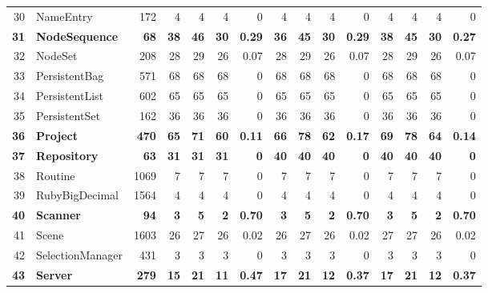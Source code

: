 \documentclass{acm_proc_article-sp}
\begin{document}
\begin{table} [htp!]
{\begin{tabularx}{1 \textwidth}{r l r r r r r r r r r r r r r}
30						& NameEntry				&172		& 4		&	4	&	4	& 	0					& 4		& 4 		& 4		& 		0			& 4			& 4			& 4			&	0	\\  
\textbf{31}						& \textbf{NodeSequence}			&\textbf{68}			& \textbf{38}		&	\textbf{46}	&	\textbf{30}	& 	\textbf{0.29}					& \textbf{36}		& \textbf{45} 		& \textbf{30}		& 		\textbf{0.29}			& \textbf{38}			& \textbf{45}			& \textbf{30}			&	\textbf{0.27}	\\     
32						& NodeSet				&208		& 28		&	29	&	26	& 	0.07					& 28		& 29 		& 26		& 		0.07			& 28			& 29			& 26			&	0.07	\\  
33						& PersistentBag			&571		& 68		&	68	&	68	& 	0					& 68		&  68		& 68		& 		0			& 68			& 68			& 68			&	0	\\         
34						& PersistentList				&602		& 65		&	65	&	65	& 	0					& 65		&  65		& 65		& 		0			& 65			& 65			& 65			&	0	\\    
35						& PersistentSet				&162		& 36		&	36	&	36	& 	0					& 36		&  36		& 36		& 		0			& 36			& 36			& 36 			&	0	\\        
\textbf{36}						& \textbf{Project}					&\textbf{470}		& \textbf{65}		&	\textbf{71}	&	\textbf{60}	& 	\textbf{0.11}					& \textbf{66}		&  \textbf{78}		& \textbf{62}		& 		\textbf{0.17}			& \textbf{69}			& \textbf{78}			& \textbf{64}			&	\textbf{0.14}	\\        
\textbf{37}						& \textbf{Repository}				&\textbf{63}			& \textbf{31}		&	\textbf{31}	&	\textbf{31}	& 	\textbf{0}					& \textbf{40}		&  \textbf{40}		& \textbf{40}		& 		\textbf{0}			& \textbf{40}			& \textbf{40}			& \textbf{40}			&	\textbf{0}	\\         
38						& Routine					&1069		& 7		&	7	&	7	& 	0					& 7		&  7		& 7		& 		0			& 7			& 7			& 7			&	0	\\
39						& RubyBigDecimal			&1564		& 4 		&	4	&	4	& 	0					& 4		& 4 		& 4		& 		0			& 4			& 4			& 4			&	0\\      
\textbf{40}						& \textbf{Scanner}				&\textbf{94}			& \textbf{3}		&	\textbf{5}	&	\textbf{2}	& 	\textbf{0.70}					& \textbf{3}		& \textbf{5} 		& \textbf{2}		& 		\textbf{0.70}			& \textbf{3}			& \textbf{5}			& \textbf{2}			&	\textbf{0.70}\\      
41						& Scene					&1603		& 26		&	27	&	26	& 	0.02					& 26		& 27 		& 26		& 		0.02			& 27			& 27			& 26			&	0.02\\      
42						& SelectionManager			&431		& 3		&	3	&	3	& 	0					& 3		& 3 		& 3		& 		0			& 3			& 3			& 3			&	0\\      
\textbf{43}						& \textbf{Server}					&\textbf{279}		&\textbf{15}		&	\textbf{21}	&	\textbf{11}	& 	\textbf{0.47}					& \textbf{17}		& \textbf{21} 		& \textbf{12}		& 		\textbf{0.37}			& \textbf{17}			& \textbf{21}			& \textbf{12}			&	\textbf{0.37}\\      

\end{tabularx}}
\end{table}
\end{document}
